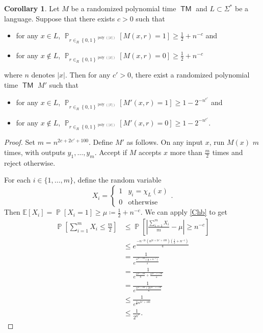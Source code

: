 \documentclass[10pt,letterpaper,cm]{nupset}
\theoremstyle{definition}
\theoremstyle{theorem}
\newtheorem{corollary}[definition]{Corollary}
\theoremstyle{remark}
\newcommand{\1}{\mathbf{1}}
\newcommand{\0}{\vec 0}
\DeclareMathOperator{\pr}{\mathbb{P}}
\DeclareMathOperator{\TM}{\mathsf{TM}}
\DeclareMathOperator{\poly}{poly}
\begin{document}
\begin{corollary}
Let $M$ be a randomized polynomial time $\TM$ and $L\subset \Sigma^{\ast}$ be a language. Suppose that there exists $c>0$ such that
\begin{itemize}
\item for any $x\in L$, $\pr_{r\in_R \left\{0,1\right\}^{\poly(\left\lvert{x}\right\rvert)}}\left[M(x,r)=1\right] \geq \frac{1}{2} +n^{-c}$ and
\item for any $x\notin L$, $\pr_{r\in_R \left\{0,1\right\}^{\poly(\left\lvert{x}\right\rvert)}}\left[M(x,r)=0\right] \geq \frac{1}{2} + n^{-c}$
\end{itemize} where $n$ denotes $\left\lvert{x}\right\rvert$.
Then for any $c' >0$, there exist a randomized polynomial time $\TM$ $M'$ such that 
\begin{itemize}
\item for any $x\in L$, $\pr_{r\in_R \left\{0,1\right\}^{\poly(\left\lvert{x}\right\rvert)}}\left[M'(x,r)=1\right] \geq 1 - 2^{{-}n^{c'}}$ and
\item for any $x\notin L$, $\pr_{r\in_R \left\{0,1\right\}^{\poly(\left\lvert{x}\right\rvert)}}\left[M'(x,r)=0\right] \geq 1 - 2^{{-}n^{c'}}$.
\end{itemize}
\end{corollary}
\begin{proof}
Set $m = n^{2c + 2c' + 100}$. Define $M'$ as follows. On any input $x$, run $M(x)$ $m$ times, with outputs $y_1, \ldots, y_m$. Accept if $M$ accepts $x$ more than $\frac{m}{2}$ times and reject otherwise.

\medskip

  For each $i\in \{1, \ldots, m\}$, define the random variable $$ X_i = \begin{cases} 1 & y_i = \chi_L(x) \\ 0 & \text{otherwise} \end{cases} .$$ Then $\mathbb{E}[X_i] = \pr[X_i=1] \geq \mu\coloneqq \frac{1}{2} + n^{{-}c}$. We can apply \cref{Chb} to get   
\begin{align*}
 \pr\left[\sum_{i=1}^m X_i \leq \frac{m}{2}\right] & \leq \pr\left[ \left\lvert{\frac{\sum_{i=1}^m X_i}{m} -\mu}\right\rvert \geq n^{-c}\right] 
\\ & \leq
 e^{ \frac{ {-}n^{{-2}c}(n^{2c + 2c' + 100})(\frac{1}{2}+ n^{-c})}{4}
 }
 \\ & = \frac{1}{e^{\frac{ n^{2c' +100}(\frac{1}{2} + n^{{-}c} )                 }{  4   }}  }
 \\ & = \frac{1}{e^{ \frac{n^{2c' +100}}{8} +\frac{n^{2c' -c+100}}{4}          }}
 \\ & =  \frac{1}{e^{ \frac{n^{2c' +100} + 2 n^{2c' -c+100}}{8}       }}
 \\ &
 \leq \frac{1}{e^{\frac{1}{8}n^{2c' +100}}   }
 \\ & \leq \frac{1}{2^{n^{c'}}} . 
\end{align*} 
\end{proof}
\end{document}
